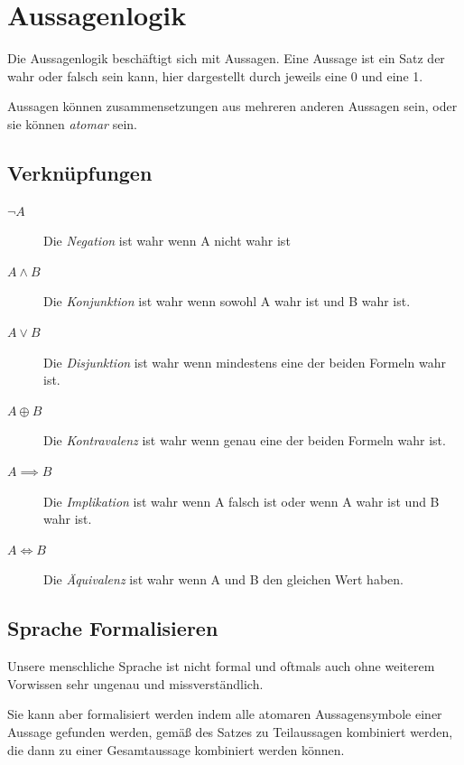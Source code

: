 \documentclass{article}
\begin{document}
\section{Aussagenlogik} 
Die Aussagenlogik beschäftigt sich mit Aussagen. Eine Aussage ist ein Satz der wahr oder falsch sein kann, hier dargestellt durch jeweils eine 0 und eine 1.

Aussagen können zusammensetzungen aus mehreren anderen Aussagen sein, oder sie können \emph{atomar} sein.

\subsection{Verknüpfungen}
\begin{description}
 \item[$\neg A$] Die \emph{Negation}  ist wahr wenn A nicht wahr ist
 \item[$A \land B$] Die \emph{Konjunktion}  ist wahr wenn sowohl A wahr ist und B wahr ist.
 \item[$A \lor B$] Die \emph{Disjunktion}  ist wahr wenn mindestens eine der beiden Formeln wahr ist.
 \item[$A \oplus B$] Die \emph{Kontravalenz}  ist wahr wenn genau eine der beiden Formeln wahr ist. 
 \item[$A \implies B$] Die \emph{Implikation}  ist wahr wenn A falsch ist oder wenn A wahr ist und B wahr ist.
 \item[$A \iff B$] Die \emph{Äquivalenz}  ist wahr wenn A und B den gleichen Wert haben.
\end{description}

\subsection{Sprache Formalisieren}
Unsere menschliche Sprache ist nicht formal und oftmals auch ohne weiterem Vorwissen sehr ungenau und missverständlich.

Sie kann aber formalisiert werden indem alle atomaren Aussagensymbole einer Aussage gefunden werden, gemäß des Satzes zu Teilaussagen kombiniert werden, die dann zu einer Gesamtaussage kombiniert werden können.
\end{document}

